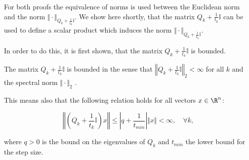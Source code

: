 
For both proofs the equivalence of norms is used between the Euclidean norm and the norm \(\Vert \cdot \Vert_{Q_k+\frac{1}{t_k}\mathbb{I}}\).
We show here shortly, that the matrix \(Q_k+\frac{1}{t_k}\mathbb{I}\) can be used to define a scalar product which induces the norm \(\Vert \cdot \Vert_{Q_k+\frac{1}{t_k}\mathbb{I}}\).

In order to do this, it is first shown, that the matrix \(Q_k+\frac{1}{t_k}\mathbb{I}\) is bounded.

\begin{proposition}
\label{prop_bounded}
	The matrix \(Q_k+\frac{1}{t_k}\mathbb{I}\) is bounded in the sense that \(\left\Vert Q_k+\frac{1}{t_k}\mathbb{I} \right\Vert_2 < \infty \) for all \(k\) and the spectral norm \(\Vert \cdot \Vert_2\) \cite[Example 5.6.6]{Horn2012}.
	
	This means also that the following relation holds for all vectors \(x\in\R^n\):
	
	\begin{equation}
		\left\Vert\left(Q_k+\frac{1}{t_k}\mathbb{I}\right)x\right\Vert \leq \left\vert q + \frac{1}{t_{min}} \right\vert \Vert x\Vert < \infty , \quad \forall k,
		\label{rel_bound}
	\end{equation}
	
	where \(q > 0\) is the bound on the eigenvalues of \(Q_k\) and \(t_{min}\) the lower bound for the step size.
\end{proposition}

